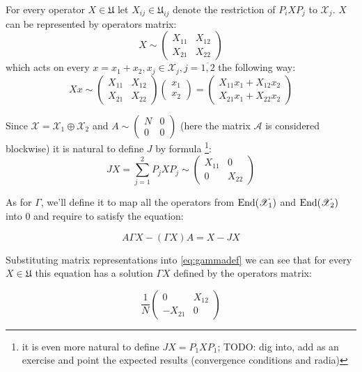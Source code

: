\documentclass{article}
\begin{document}
For every operator $X\in\mathfrak U$
let $X_{ij} \in \mathfrak U_{ij}$ denote the restriction of $P_i X P_j$ to $\mathscr X_j$.
$X$ can be represented by operators matrix:
$$X \sim \begin{pmatrix}
    X_{11} & X_{12} \\
    X_{21} & X_{22}
\end{pmatrix}$$
which acts on every $x = x_1 + x_2, x_j\in\mathscr X_j,j=\overline{1,2}$ the following way:
$$
X x \sim
\begin{pmatrix}
    X_{11} & X_{12} \\
    X_{21} & X_{22}
\end{pmatrix}
\begin{pmatrix} x_1 \\ x_2 \end{pmatrix}
= \begin{pmatrix}
    X_{11} x_1 + X_{12} x_2 \\
    X_{21} x_1 + X_{22} x_2
\end{pmatrix}
$$

Since $\mathscr X = \mathscr X_1 \oplus \mathscr X_2$ and $A \sim \begin{pmatrix} N & 0 \\ 0 & 0 \end{pmatrix}$
(here the matrix $\mathcal A$ is considered blockwise)
it is natural to define $J$ by formula
    \footnote{it is even more natural to define $JX=P_1XP_1$;
    TODO: dig into, add as an exercise and point the expected results (convergence conditions and radia)}:
$$JX = \sum_{j=1}^2 P_j X P_j \sim \begin{pmatrix} X_{11} & 0 \\ 0 & X_{22} \end{pmatrix}$$

As for $\Gamma$, we'll define it to map
all the operators from $\mathrm{End}({\mathscr X_1})$ and $\mathrm{End}({\mathscr X_2})$ into $0$
and require to satisfy the equation:

\begin{equation}
\label{eq:gammadef}
    A\Gamma X - (\Gamma X) A = X - JX
\end{equation}

Substituting matrix representations into \eqref{eq:gammadef} we can see
that for every $X \in \mathfrak U$ this equation has a solution $\Gamma X$
defined by the operators matrix:

$$
\frac{1}{N}
\begin{pmatrix}
    0       & X_{12} \\
    -X_{21} & 0
\end{pmatrix}
$$
\end{document}
